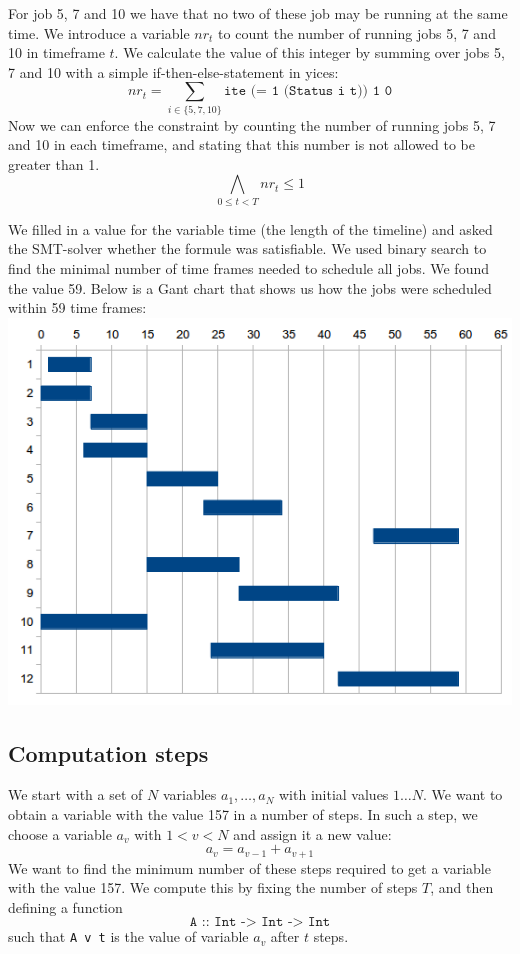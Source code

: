 \documentclass[12pt]{article}
\begin{document}
For job 5, 7 and 10 we have that no two of these job may be running at the same time. 
We introduce a variable $nr_t$ to count the number of running jobs 5, 7 and 10 in timeframe $t$.
We calculate the value of this integer by summing over jobs 5, 7 and 10 with a simple if-then-else-statement in yices: 
\[ nr_t = \sum_{i \in \{5,7,10\}} \texttt{ite (= 1 (Status i t)) 1 0} \]
Now we can enforce the constraint by counting the number of running jobs 5, 7 and 10 in each timeframe, 
and stating that this number is not allowed to be greater than 1. 
\[ \bigwedge_{0 \le t < T} nr_t \le 1\]

We filled in a value for the variable time (the length of the timeline) 
and asked the SMT-solver whether the formule was satisfiable. 
We used binary search to find the minimal number of time frames needed to schedule all jobs. 
We found the value 59. 
Below is a Gant chart that shows us how the jobs were scheduled within 59 time frames:
\includegraphics[width=15cm]{gantchart.png}

\subsection*{Computation steps}
We start with a set of $N$ variables $a_1, \dots, a_N$ with initial values $1 \dots N$.
We want to obtain a variable with the value 157 in a number of steps. 
In such a step, we choose a variable $a_v$ with $1 < v < N$ and assign it a new value:
\[ a_v = a_{v-1} + a_{v+1} \]
We want to find the minimum number of these steps required to get a variable with the value 157.
We compute this by fixing the number of steps $T$, and then defining a function
\[\texttt{A :: Int -> Int -> Int}\]
such that \texttt{A v t} is the value of variable $a_v$ after $t$ steps.
\end{document}
